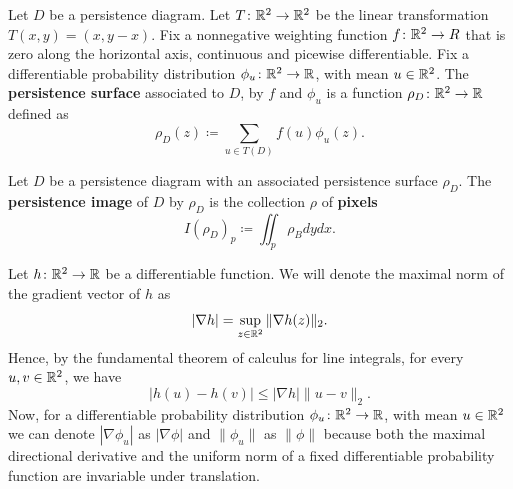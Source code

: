 \begin{definition}
    Let $ D $ be a persistence diagram. Let $ T \colon \mathbb R^2 \to \mathbb R^2 $ be the linear transformation $ T(x, y) = (x, y-x) $. Fix a nonnegative weighting function $ f \colon \mathbb R^2 \to R $ that is zero along the horizontal axis, continuous and picewise differentiable. Fix a differentiable probability distribution $ \phi_u \colon \mathbb R^2 \to \mathbb R $, with mean $ u \in \mathbb R^2 $. The {\bf persistence surface} associated to $ D $, by $ f $ and $ \phi_u $ is a function $ \rho_D \colon \mathbb R^2 \to \mathbb R $ defined as
    \begin{equation}
        \rho_D(z) \coloneq \sum_{u \in T(D)} f(u) \phi_u(z).
    \end{equation}
\end{definition}

\begin{definition}
    Let $ D $ be a persistence diagram with an associated persistence surface $ \rho_D $. The {\bf persistence image} of $ D $ by $ \rho_D $ is the collection $ \rho $ of {\bf pixels}
    \begin{equation}
        I(\rho_D)_p \coloneq \iint_p \rho_B dy dx.
    \end{equation}
\end{definition}

Let $ h \colon \mathbb R^2 \to \mathbb R $ be a differentiable function. We will denote the maximal norm of the gradient vector of $ h $ as
\begin{equation}
    |\nabla h | = \sup_{z \in \mathbb R^2} \| \nabla h(z) \|_2.
\end{equation}
Hence, by the fundamental theorem of calculus for line integrals, for every $ u, v \in \mathbb R^2 $, we have
\begin{equation}
    |h(u) - h(v)| \leq |\nabla h| \|u-v\|_2.
\end{equation}
Now, for a differentiable probability distribution $ \phi_u \colon \mathbb R^2 \to \mathbb R $, with mean $ u \in \mathbb R^2 $ we can denote $ |\nabla \phi_u| $ as $ |\nabla \phi| $ and $ \|\phi_u\| $ as $ \|\phi\| $ because both the maximal directional derivative and the uniform norm of a fixed differentiable probability function are invariable under translation.

